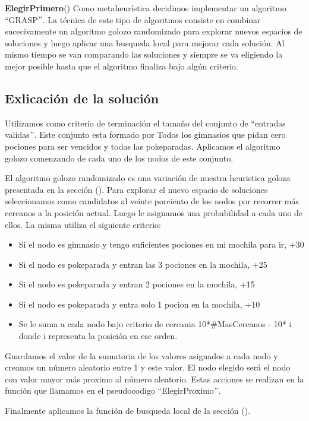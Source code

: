 \documentclass[spanish,12pt]{article}
\begin{document}
\begin{algorithm}[H]{\textbf{ElegirPrimero}()}
Como metaheurística decidimos implementar un algoritmo ``GRASP$"$.
La técnica de este tipo de algoritmos consiste en combinar sucecivamente un algoritmo golozo randomizado para explorar nuevos espacios de soluciones y luego aplicar una busqueda local para mejorar cada solución. Al mismo tiempo se van comparando las soluciones y siempre se va eligiendo la mejor posible hasta que el algoritmo finaliza bajo algún criterio.

\subsection{Exlicación de la solución}

Utilizamos como criterio de terminación el tamaño del conjunto de ``entradas validas$"$. Este conjunto esta formado por Todos los gimnasios que pidan cero pociones para ser vencidos y todas las pokeparadas. Aplicamos el algoritmo golozo comenzando de cada uno de los nodos de este conjunto. 

El algoritmo golozo randomizado es una variación de nuestra heuristica goloza presentada en la sección (). %
Para explorar el nuevo espacio de soluciones seleccionamos como candidatos al veinte porciento de los nodos por recorrer más cercanos a la posición actual.
Luego le asignamos una probabilidad a cada uno de ellos. La misma utiliza el siguiente criterio:

\begin{itemize}
	\item Si el nodo es gimnasio y tengo suficientes pociones en mi mochila para ir, +30
	\item Si el nodo es pokeparada y entran las 3 pociones en la mochila, +25
	\item Si el nodo es pokeparada y entran 2 pociones en la mochila, +15
	\item Si el nodo es pokeparada y entra solo 1 pocion en la mochila, +10
	\item Se le suma a cada nodo  bajo criterio de cercania 10*$\# $MasCercanos - 10* i donde i representa la posición en ese orden.
\end{itemize} 

Guardamos el valor de la sumatoria de los valores asignados a cada nodo  y creamos un número aleatorio entre 1 y este valor. El nodo elegido será el nodo con valor mayor más proximo al número aleatorio. Estas acciones se realizan en la función que llamamos en el pseudocodigo ``ElegirProximo$"$. 

Finalmente aplicamos la función de busqueda local de la sección ().



\end{algorithm}
\end{document}

